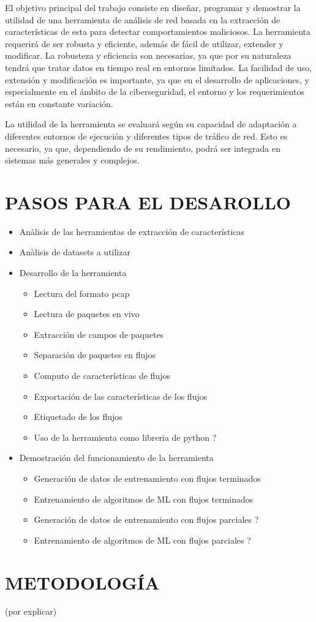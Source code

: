 El objetivo principal del trabajo consiste en diseñar, programar y demostrar la utilidad de una herramienta de análisis de red basada en la extracción de características de esta para detectar comportamientos maliciosos. La herramienta requerirá de ser robusta y eficiente, además de fácil de utilizar, extender y modificar. La robusteza y eficiencia son necesarias, ya que por su naturaleza tendrá que tratar datos en tiempo real en entornos limitados. La facilidad de uso, extensión y modificación es importante, ya que en el desarrollo de aplicaciones, y especialmente en el ámbito de la ciberseguridad, el entorno y los requerimientos están en constante variación.

La utilidad de la herramienta se evaluará según su capacidad de adaptación a diferentes entornos de ejecución y diferentes tipos de tráfico de red. Esto es necesario, ya que, dependiendo de su rendimiento, podrá ser integrada en sistemas más generales y complejos.

\section*{PASOS PARA EL DESAROLLO}

\begin{itemize}
  \item Anàlisis de las herramientas de extracción de características
  \item Anàlisis de datasets a utilizar
  \item Desarrollo de la herramienta
  \begin{itemize}
    \item Lectura del formato pcap
    \item Lectura de paquetes en vivo
    \item Extracción de campos de paquetes
    \item Separación de paquetes en flujos
    \item Computo de características de flujos
    \item Exportación de las características de los flujos
    \item Etiquetado de los flujos
    \item Uso de la herramienta como libreria de python ?
  \end{itemize}
  \item Demostración del funcionamiento de la herramienta
  \begin{itemize}
    \item Generación de datos de entrenamiento con flujos terminados
    \item Entrenamiento de algoritmos de ML con flujos terminados
    \item Generación de datos de entrenamiento con flujos parciales ?
    \item Entrenamiento de algoritmos de ML con flujos parciales ?
  \end{itemize}
\end{itemize}

\section*{METODOLOGÍA}

(por explicar)
